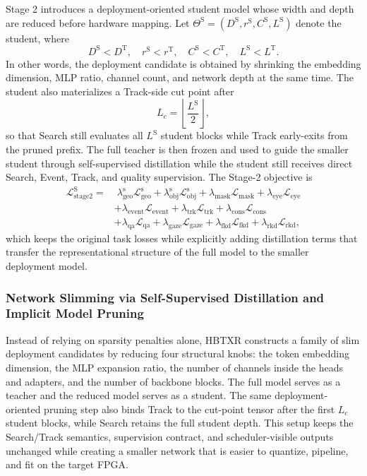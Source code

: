 \documentclass[journal]{IEEEtran}
\begin{document}
Stage 2 introduces a deployment-oriented student model whose width and depth are reduced before hardware mapping. Let $\Theta^{\mathrm{S}}=(D^{\mathrm{S}}, r^{\mathrm{S}}, C^{\mathrm{S}}, L^{\mathrm{S}})$ denote the student, where
\begin{equation}
D^{\mathrm{S}}<D^{\mathrm{T}},\quad
r^{\mathrm{S}}<r^{\mathrm{T}},\quad
C^{\mathrm{S}}<C^{\mathrm{T}},\quad
L^{\mathrm{S}}<L^{\mathrm{T}}.
\end{equation}
In other words, the deployment candidate is obtained by shrinking the embedding dimension, MLP ratio, channel count, and network depth at the same time. The student also materializes a Track-side cut point after
\begin{equation}
L_c = \left\lfloor \frac{L^{\mathrm S}}{2} \right\rfloor,
\end{equation}
so that Search still evaluates all $L^{\mathrm S}$ student blocks while Track early-exits from the pruned prefix. The full teacher is then frozen and used to guide the smaller student through self-supervised distillation while the student still receives direct Search, Event, Track, and quality supervision. The Stage-2 objective is
\begin{align}
\mathcal L_{\mathrm{stage2}}^{\mathrm{S}} =
&\;\lambda_{\mathrm{geo}}^{\mathrm{s}}\mathcal L_{\mathrm{geo}}^{\mathrm{s}}
+ \lambda_{\mathrm{obj}}^{\mathrm{s}}\mathcal L_{\mathrm{obj}}^{\mathrm{s}}
+ \lambda_{\mathrm{mask}}\mathcal L_{\mathrm{mask}}
+ \lambda_{\mathrm{eye}}\mathcal L_{\mathrm{eye}}
\nonumber\\
&+ \lambda_{\mathrm{event}}\mathcal L_{\mathrm{event}}
+ \lambda_{\mathrm{trk}}\mathcal L_{\mathrm{trk}}
+ \lambda_{\mathrm{cons}}\mathcal L_{\mathrm{cons}}
\nonumber\\
&+ \lambda_{\mathrm{qa}}\mathcal L_{\mathrm{qa}}
+ \lambda_{\mathrm{gaze}}\mathcal L_{\mathrm{gaze}}
+ \lambda_{\mathrm{fkd}}\mathcal L_{\mathrm{fkd}}
+ \lambda_{\mathrm{rkd}}\mathcal L_{\mathrm{rkd}},
\end{align}
which keeps the original task losses while explicitly adding distillation terms that transfer the representational structure of the full model to the smaller deployment model.

\subsubsection{Network Slimming via Self-Supervised Distillation and Implicit Model Pruning}
Instead of relying on sparsity penalties alone, HBTXR constructs a family of slim deployment candidates by reducing four structural knobs: the token embedding dimension, the MLP expansion ratio, the number of channels inside the heads and adapters, and the number of backbone blocks. The full model serves as a teacher and the reduced model serves as a student. The same deployment-oriented pruning step also binds Track to the cut-point tensor after the first $L_c$ student blocks, while Search retains the full student depth. This setup keeps the Search/Track semantics, supervision contract, and scheduler-visible outputs unchanged while creating a smaller network that is easier to quantize, pipeline, and fit on the target FPGA.
\end{document}
